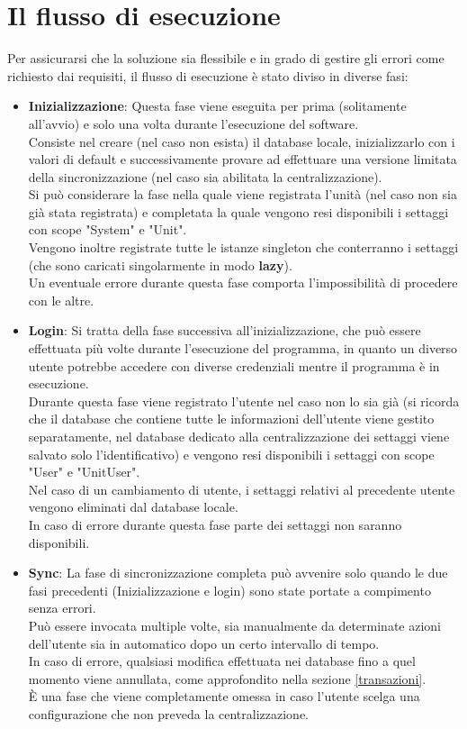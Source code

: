 \documentclass[\main/tesi.tex]{subfiles}
\begin{document}
\section{Il flusso di esecuzione}
Per assicurarsi che la soluzione sia flessibile e in grado di gestire gli errori come richiesto dai requisiti, il flusso di esecuzione è stato diviso in diverse fasi:
\begin{itemize}
    \item \textbf{Inizializzazione}: Questa fase viene eseguita per prima (solitamente all'avvio) e solo una volta durante l'esecuzione del software.\\Consiste nel creare (nel caso non esista) il database locale, inizializzarlo con i valori di default e successivamente provare ad effettuare una versione limitata della sincronizzazione (nel caso sia abilitata la centralizzazione).\\Si può considerare la fase nella quale viene registrata l'unità (nel caso non sia già stata registrata) e completata la quale vengono resi disponibili i settaggi con scope "System" e "Unit".\\Vengono inoltre registrate tutte le istanze singleton che conterranno i settaggi (che sono caricati singolarmente in modo \textbf{lazy}).\\Un eventuale errore durante questa fase comporta l'impossibilità di procedere con le altre.
    \item \textbf{Login}: Si tratta della fase successiva all'inizializzazione, che può essere effettuata più volte durante l'esecuzione del programma, in quanto un diverso utente potrebbe accedere con diverse credenziali mentre il programma è in esecuzione.\\Durante questa fase viene registrato l'utente nel caso non lo sia già (si ricorda che il database che contiene tutte le informazioni dell'utente viene gestito separatamente, nel database dedicato alla centralizzazione dei settaggi viene salvato solo l'identificativo) e vengono resi disponibili i settaggi con scope "User" e "UnitUser".\\Nel caso di un cambiamento di utente, i settaggi relativi al precedente utente vengono eliminati dal database locale.\\In caso di errore durante questa fase parte dei settaggi non saranno disponibili.
    \item \textbf{Sync}: La fase di sincronizzazione completa può avvenire solo quando le due fasi precedenti (Inizializzazione e login) sono state portate a compimento senza errori.\\Può essere invocata multiple volte, sia manualmente da determinate azioni dell'utente sia in automatico dopo un certo intervallo di tempo.\\In caso di errore, qualsiasi modifica effettuata nei database fino a quel momento viene annullata, come approfondito nella sezione \ref{transazioni}.\\È una fase che viene completamente omessa in caso l'utente scelga una configurazione che non preveda la centralizzazione.

\end{itemize}
\end{document}
